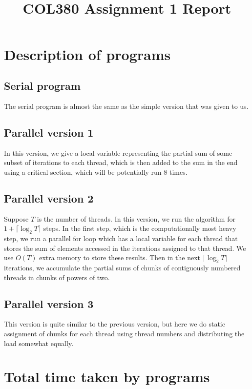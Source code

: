 \documentclass[a4paper]{article}
\title{\textbf{COL380 Assignment 1 Report}}
\date{}
\begin{document}
\maketitle
\tableofcontents

\section{Description of programs}

\subsection{Serial program}

The serial program is almost the same as the simple version that was given to us.

\subsection{Parallel version 1}

In this version, we give a local variable representing the partial sum of some subset of iterations to each thread, which is then added to the sum in the end using a critical section, which will
be potentially run 8 times.

\subsection{Parallel version 2}

Suppose $T$ is the number of threads. In this version, we run the algorithm for $1 + \lceil \log_2 T \rceil$ steps. In the first step, which is the computationally most heavy step, we run a parallel for loop which has a local
variable for each thread that stores the sum of elements accessed in the iterations assigned to that thread. We use $O(T)$ extra memory to store these results. Then in the next $\lceil
\log_2 T \rceil$ iterations, we accumulate the partial sums of chunks of contiguously numbered threads in chunks of powers of two.

\subsection{Parallel version 3}

This version is quite similar to the previous version, but here we do static assignment of chunks for each thread using thread numbers and distributing the load somewhat equally.

\section{Total time taken by programs}
\end{document}
